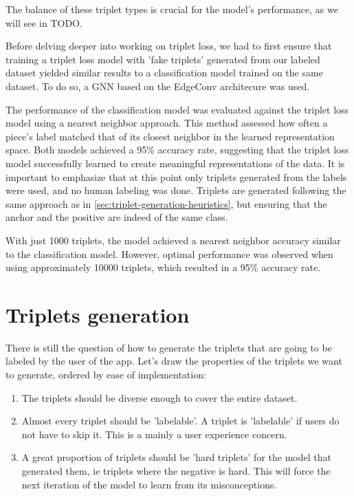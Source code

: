 The balance of these triplet types is crucial for the model's performance, as we will see in TODO.

Before delving deeper into working on triplet loss, we had to first ensure that training a triplet loss model with 'fake triplets' generated from our labeled dataset yielded similar results to a classification model trained on the same dataset. To do so, a GNN based on the EdgeConv architecure \cite{wangDynamicGraphCNN2019} was used. 

The performance of the classification model was evaluated against the triplet loss model using a nearest neighbor approach. This method assessed how often a piece's label matched that of its closest neighbor in the learned representation space. Both models achieved a 95\% accuracy rate, suggesting that the triplet loss model successfully learned to create meaningful representations of the data. It is important to emphasize that at this point only triplets generated from the labels were used, and no human labeling was done. Triplets are generated following the same approach as in \autoref{sec:triplet-generation-heuristics}, but ensuring that the anchor and the positive are indeed of the same class. 

With just 1000 triplets, the model achieved a nearest neighbor accuracy similar to the classification model. However, optimal performance was observed when using approximately 10000 triplets, which resulted in a 95\% accuracy rate.

\section{Triplets generation}
\label{sec:triplet-generation}

There is still the question of how to generate the triplets that are going to be labeled by the user of the app. Let's draw the properties of the triplets we want to generate, ordered by ease of implementation:
\begin{enumerate}
  \item The triplets should be diverse enough to cover the entire dataset.
  \item Almost every triplet should be 'labelable'. A triplet is 'labelable' if users do not have to skip it. This is a mainly a user experience concern. 
  \item A great proportion of triplets should be 'hard triplets' for the model that generated them, ie triplets where the negative is hard. This will force the next iteration of the model to learn from its misconceptions.
\end{enumerate}


